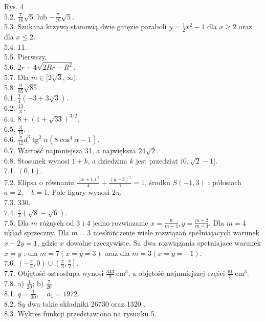 \documentclass[10pt]{article}
\begin{document}
Rys. 4\\
5.2. $\frac{7}{16} \sqrt{5}$ lub $-\frac{7}{16} \sqrt{5}$.\\
5.3. Szukana krzywą stanowią dwie gatęzie paraboli $y=\frac{1}{2} x^{2}-1$ dla $x \geq 2$ oraz dla $x \leq 2$.\\
5.4. 11.\\
5.5. Pierwszy.\\
5.6. $2 r+4 \sqrt{2 R r-R^{2}}$.\\
5.7. Dla $m \in[2 \sqrt{3}, \infty)$.\\
5.8. $\frac{9}{85} \sqrt{85}$.\\
6.1. $\frac{1}{4}(-3+3 \sqrt{3})$.\\
6.2. $\frac{13}{3}$.\\
6.4. $8+(1+\sqrt{33})^{3 / 2}$.\\
6.5. $\frac{3}{10}$.\\
6.6. $\frac{\pi}{12} d^{3} \operatorname{tg}^{2} \alpha\left(8 \cos ^{4} \alpha-1\right)$.\\
6.7. Wartość najmniejsza 31, a największa $24 \sqrt{2}$.\\
6.8. Stosunek wynosi $1+k$, a dziedzina $k$ jest przedziat $(0, \sqrt{2}-1]$.\\
7.1. $(0,1)$.\\
7.2. Elipsa o równaniu $\frac{(x+1)^{2}}{4}+\frac{(y-3)^{2}}{1}=1$, środku $S(-1,3)$ i półosiach $a=2, \quad b=1$. Pole figury wynosi $2 \pi$.\\
7.3. 330.\\
7.4. $\frac{\pi}{4}(\sqrt{8}-\sqrt{6})$.\\
7.5. Dla $m$ różnych od 3 i 4 jedno rozwiazanie $x=\frac{9}{m-4}, y=\frac{m+2}{m-4}$. Dla $m=4$ układ sprzeczny. Dla $m=3$ nieskończenie wiele rozwiązań spełniajacych warunek $x-2 y=1$, gdzie $x$ dowolne rzeczywiste. Sa dwa rozwiązania spetniajace warunek $x=y$ : dla $m=7(x=y=3)$ oraz dla $m=3(x=y=-1)$.\\
7.6. $\left(-\frac{\pi}{3}, 0\right) \cup\left(\frac{\pi}{3}, \frac{\pi}{2}\right]$.\\
7.7. Objętość ostrosłupa wynosi $\frac{343}{3} \mathrm{~cm}^{3}$, a objętość najmniejszej części $\frac{61}{3} \mathrm{~cm}^{3}$.\\
7.8. a) $\frac{1}{20}$; b) $\frac{7}{20}$.\\
8.1. $q=\frac{1}{30}, \quad a_{1}=1972$.\\
8.2. Są dwa takie składniki 26730 oraz 1320 .\\
8.3. Wykres funkcji przedstawiono na rysunku 5.\\
\end{document}
